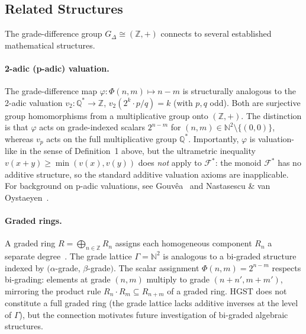 \documentclass[12pt,a4paper]{article}
\theoremstyle{plain}
\theoremstyle{definition}
\theoremstyle{remark}
\begin{document}
\subsection{Related Structures}
\label{sec:related-structures}

The grade-difference group $G_\Delta \cong (\mathbb{Z},+)$ connects to
several established mathematical structures.

\paragraph{2-adic (p-adic) valuation.}
The grade-difference map $\varphi: \Phi(n,m) \mapsto n-m$ is structurally
analogous to the 2-adic valuation $v_2: \mathbb{Q}^* \to \mathbb{Z}$,
$v_2(2^k \cdot p/q) = k$ (with $p,q$ odd).
Both are surjective group homomorphisms from a multiplicative group
onto $(\mathbb{Z},+)$.
The distinction is that $\varphi$ acts on grade-indexed scalars
$2^{n-m}$ for $(n,m)\in\mathbb{N}^2\setminus\{(0,0)\}$, whereas
$v_p$ acts on the full multiplicative group $\mathbb{Q}^*$.
Importantly, $\varphi$ is valuation-like in the sense of Definition~1 above,
but the ultrametric inequality $v(x+y)\geq\min(v(x),v(y))$ does
\emph{not} apply to $\mathcal{F}^*$: the monoid $\mathcal{F}^*$ has no
additive structure, so the standard additive valuation axioms are inapplicable.
For background on p-adic valuations, see Gouvêa~\cite{Gouvea1997}
and Nastasescu \& van Oystaeyen~\cite{NastasescuVanOystaeyen2004}.

\paragraph{Graded rings.}
A graded ring $R = \bigoplus_{n\in\mathbb{Z}} R_n$ assigns each homogeneous
component $R_n$ a separate degree~\cite{NastasescuVanOystaeyen2004}.
The grade lattice $\Gamma = \mathbb{N}^2$ is analogous to a bi-graded
structure indexed by $(\alpha$-grade, $\beta$-grade$)$.
The scalar assignment $\Phi(n,m) = 2^{n-m}$ respects bi-grading: elements
at grade $(n,m)$ multiply to grade $(n+n',m+m')$, mirroring the
product rule $R_n \cdot R_m \subseteq R_{n+m}$ of a graded ring.
HGST does not constitute a full graded ring (the grade lattice lacks
additive inverses at the level of $\Gamma$), but the connection motivates
future investigation of bi-graded algebraic structures.

\end{document}
